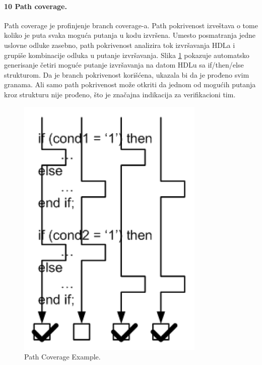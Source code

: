 \documentclass[a4paper, 12pt]{article}
\begin{document}
\paragraph{10 Path coverage.}
\hfill \break
\indent Path coverage je profinjenje branch coverage-a. Path pokrivenost izveštava o tome koliko je puta svaka moguća putanja u kodu izvršena. Umesto posmatranja jedne uslovne odluke zasebno, path pokrivenost analizira tok izvršavanja HDLa i grupiše kombinacije odluka u putanje izvršavanja. Slika \ref{img-p10-7} pokazuje automatsko generisanje četiri moguće putanje izvršavanja na datom HDLu sa if/then/else strukturom. Da je branch pokrivenost korišćena, ukazala bi da je prođeno svim granama. Ali samo path pokrivenost može otkriti da jednom od mogućih putanja kroz strukturu nije prođeno, što je značajna indikacija za verifikacioni tim.
\begin{figure}[h!]
\centering
\includegraphics[scale=0.5]{img-p10-7.png}
\caption{Path Coverage Example.}
\label{img-p10-7}
\end{figure}
\end{document}
